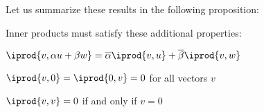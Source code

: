 Let us summarize these results in the following proposition:

\begin{prop*}

    Inner products must satisfy these additional properties:
    \benum
        \item $\iprod{v,\alpha u+\beta w}=\overline\alpha\iprod{v,u}+\overline\beta\iprod{v,w}$
        \item $\iprod{v,0}=\iprod{0,v}=0$ for all vectors $v$
        \item $\iprod{v,v}=0$ if and only if $v=0$
    \eenum

\end{prop*}

